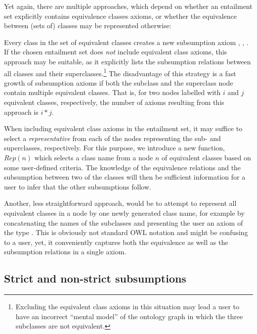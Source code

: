 Yet again, there are multiple approaches, which depend on whether an entailment set explicitly contains equivalence classes axioms, or whether the equivalence between (sets of) classes may be represented otherwise:
\begin{compactenum}

\item Every class in the set of equivalent classes creates a new subsumption axiom , , . If the chosen entailment set does \emph{not} include equivalent class axioms, this approach may be suitable, as it explicitly lists the subsumption relations between all classes and their superclasses.\footnote{Excluding the equivalent class axioms in this situation may lead a user to have an incorrect  \enquote{mental model} of the ontology graph in which the three subclasses are not equivalent.} The disadvantage of this strategy is a fast growth of subsumption axioms if both the subclass and the superclass node contain multiple equivalent classes. That is, for two nodes labelled with $i$ and $j$ equivalent classes, respectively, the number of axioms resulting from this approach is $i*j$.
 
\item When including equivalent class axioms in the entailment set, it may suffice to select a \emph{representative} from each of the nodes representing the sub- and superclasses, respectively. For this purpose, we introduce a new function, $Rep(n)$ which selects a class name from a node $n$ of equivalent classes based on some user-defined criteria. The knowledge of the equivalence relations and the subsumption between two of the classes will then be sufficient information for a user to infer that the other subsumptions follow. 

\item Another, less straightforward approach, would be to attempt to represent all equivalent classes in a node by one newly generated class name, for example by concatenating the names of the subclasses and presenting the user an axiom of the type . This is obviously not standard OWL notation and might be confusing to a user, yet, it conveniently captures both the equivalence as well as the subsumption relations in a single axiom.

\end{compactenum}


\subsection{Strict and non-strict subsumptions}

